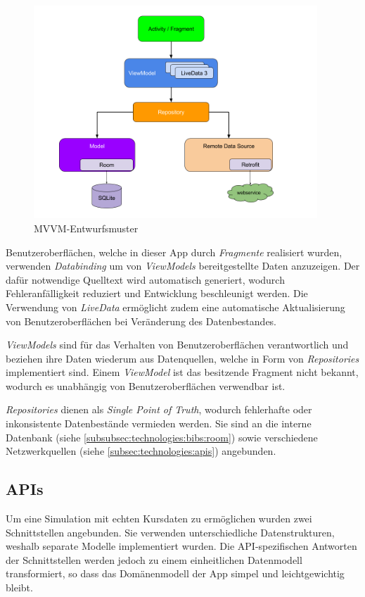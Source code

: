\documentclass[a4paper]{article}
\begin{document}
\begin{figure}[H]
	\centering
	\includegraphics[height=8cm,keepaspectratio]{./images/mvvm-architecture.png}
	\caption{MVVM-Entwurfsmuster \autocite{mvvm_architecture}}
	\label{fig:technologies:architecture:mvvm}
\end{figure}

Benutzeroberflächen, welche in dieser App durch \textit{Fragmente} realisiert wurden, verwenden \textit{Databinding} um von \textit{ViewModels} bereitgestellte Daten anzuzeigen.
Der dafür notwendige Quelltext wird automatisch generiert, wodurch Fehleranfälligkeit reduziert und Entwicklung beschleunigt werden.
Die Verwendung von \textit{LiveData} ermöglicht zudem eine automatische Aktualisierung von Benutzeroberflächen bei Veränderung des Datenbestandes.

\textit{ViewModels} sind für das Verhalten von Benutzeroberflächen verantwortlich und beziehen ihre Daten wiederum aus Datenquellen, welche in Form von \textit{Repositories} implementiert sind.
Einem \textit{ViewModel} ist das besitzende Fragment nicht bekannt, wodurch es unabhängig von Benutzeroberflächen verwendbar ist.

\textit{Repositories} dienen als \textit{Single Point of Truth}, wodurch fehlerhafte oder inkonsistente Datenbestände vermieden werden.
Sie sind an die interne Datenbank (siehe \autoref{subsubsec:technologies:bibs:room}) sowie verschiedene Netzwerkquellen (siehe \autoref{subsec:technologies:apis}) angebunden.


\subsection{APIs}
\label{subsec:technologies:apis}
Um eine Simulation mit echten Kursdaten zu ermöglichen wurden zwei Schnittstellen angebunden.
Sie verwenden unterschiedliche Datenstrukturen, weshalb separate Modelle implementiert wurden.
Die API-spezifischen Antworten der Schnittstellen werden jedoch zu einem einheitlichen Datenmodell transformiert, so dass das Domänenmodell der App simpel und leichtgewichtig bleibt.
\end{document}
